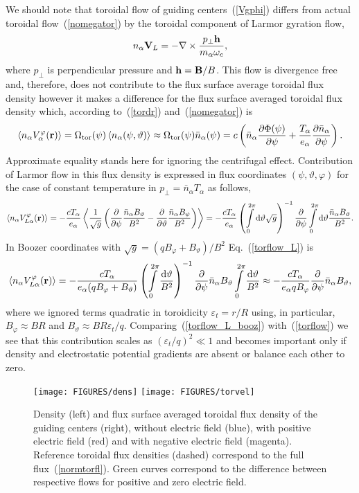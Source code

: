 \documentclass[preprint,prb,aps]{revtex4-1}
\newcommand{\be}[1]{\begin{equation} \label{#1}}
\newcommand{\ee}{\end{equation}}
\newcommand{\eq}[1]{(\ref{#1})}
\newcommand{\difp}[2]{\frac{\partial #1}{\partial #2}}
\newcommand{\br}{{\bf r}}
\newcommand{\bB}{{\bf B}}
\newcommand{\bV}{{\bf V}}
\newcommand{\rd}{{\rm d}}
\newcommand{\bh}{{\bf h}}
\begin{document}
We should note that toroidal flow of guiding centers~\eq{Vgphi} differs
from actual toroidal flow~\eq{nomegator} by the toroidal component
of Larmor gyration flow, 
\be{larmorflow}
n_\alpha \bV_L = -\nabla\times\frac{p_\perp \bh}{m_\alpha\omega_c},
\ee
where $p_\perp$ is perpendicular pressure and $\bh=\bB/B$.
This flow is divergence free and, therefore, does not contribute to the flux
surface average toroidal flux density however it makes a difference for the
flux surface averaged toroidal flux density which, according to~\eq{tordr}
and~\eq{nomegator} is
\be{torflow}
\left\langle n_\alpha V_\alpha^\varphi(\br) \right\rangle
=\Omega_{\rm tor}(\psi) \left\langle n_\alpha(\psi,\vartheta) \right\rangle
\approx\Omega_{\rm tor}(\psi) \bar n_\alpha(\psi)
=
c 
\left(\bar n_\alpha\difp{\Phi(\psi)}{\psi}
+\frac{T_\alpha}{e_\alpha}\difp{\bar n_\alpha}{\psi}\right).
\ee
Approximate equality stands here for ignoring the centrifugal effect.
Contribution of Larmor flow in this flux density 
is expressed in flux coordinates $(\psi,\vartheta,\varphi)$ 
for the case of constant temperature in $p_\perp=\bar n_\alpha T_\alpha$ 
as follows,
\be{torflow_L}
\left\langle n_\alpha V_{L\alpha}^\varphi(\br) \right\rangle
=
-\frac{cT_\alpha}{e_\alpha}
\left\langle
\frac{1}{\sqrt{g}}\left(
\difp{}{\psi}\frac{\bar n_\alpha B_\vartheta}{B^2}
-
\difp{}{\vartheta}\frac{\bar n_\alpha B_\psi}{B^2}
\right)
\right\rangle
=
-\frac{cT_\alpha}{e_\alpha}
\left(\int\limits_{0}^{2\pi}\rd \vartheta \sqrt{g}\right)^{-1}
\difp{}{\psi} 
\int\limits_{0}^{2\pi}\rd \vartheta \frac{\bar n_\alpha B_\vartheta}{B^2}.
\ee
In Boozer coordinates with $\sqrt{g}=(qB_\varphi+B_\vartheta)/B^2$ Eq.~\eq{torflow_L}
is
\be{torflow_L_booz}
\left\langle n_\alpha V_{L\alpha}^\varphi(\br) \right\rangle
=
-\frac{cT_\alpha}{e_\alpha(qB_\varphi+B_\vartheta)}
\left(\int\limits_{0}^{2\pi}\frac{\rd \vartheta}{B^2}\right)^{-1}
\difp{}{\psi} \bar n_\alpha B_\vartheta
\int\limits_{0}^{2\pi}\frac{\rd \vartheta}{B^2} 
\approx
-\frac{cT_\alpha}{e_\alpha qB_\varphi}\difp{}{\psi} \bar n_\alpha B_\vartheta,
\ee
where we ignored terms quadratic in toroidicity $\varepsilon_t=r/R$ using, in 
particular, $B_\varphi \approx BR$ and $B_\vartheta \approx BR \varepsilon_t/q$.
Comparing~\eq{torflow_L_booz} with~\eq{torflow} we see that this contribution
scales as $(\varepsilon_t/q)^2 \ll 1$ and becomes important only if density
and electrostatic potential gradients are absent or balance each other to zero.
%
\begin{figure}[ht]
\centerline{
\texttt{[image: FIGURES/dens]}
\texttt{[image: FIGURES/torvel]}
}
\caption[]{Density (left) and flux surface averaged toroidal flux
density of the guiding centers (right), without electric field (blue), with 
positive electric field (red) and with negative electric field (magenta).
Reference toroidal flux densities (dashed) correspond to the
full flux~\eq{normtorfl}. Green curves correspond to the difference between
respective flows for positive and zero electric field.
}
\label{fig:equiprofs}
\end{figure}
\end{document}
